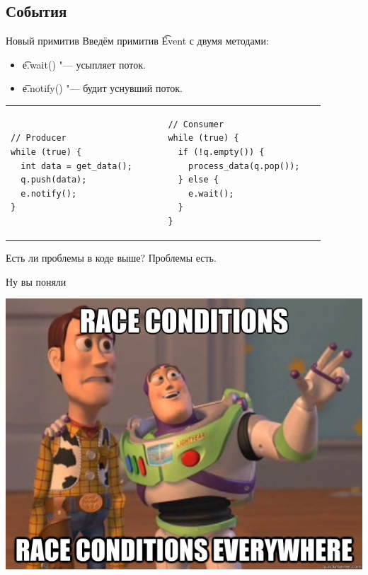 \subsection{События}

\begin{frame}[fragile]{Новый примитив}
	Введём примитив \t{Event} с двумя методами:
	\begin{itemize}
		\item \t{e.wait()} "--- усыпляет поток.
		\item \t{e.notify()} "--- будит уснувший поток.
	\end{itemize}
	\begin{tabular}{p{0.45\linewidth}p{0.45\linewidth}}
		\centering
\begin{verbatim}
// Producer
while (true) {
  int data = get_data();
  q.push(data);
  e.notify();
}
\end{verbatim}
&
\begin{verbatim}
// Consumer
while (true) {
  if (!q.empty()) {
    process_data(q.pop());
  } else {
    e.wait();
  }
}
\end{verbatim}
	\end{tabular}
	Есть ли проблемы в коде выше?
	\pause
	Проблемы есть.
\end{frame}

\begin{frame}{Ну вы поняли}
	\begin{center}
		\includegraphics[scale=0.4]{race-condition-everywhere.jpg}
	\end{center}
\end{frame}

